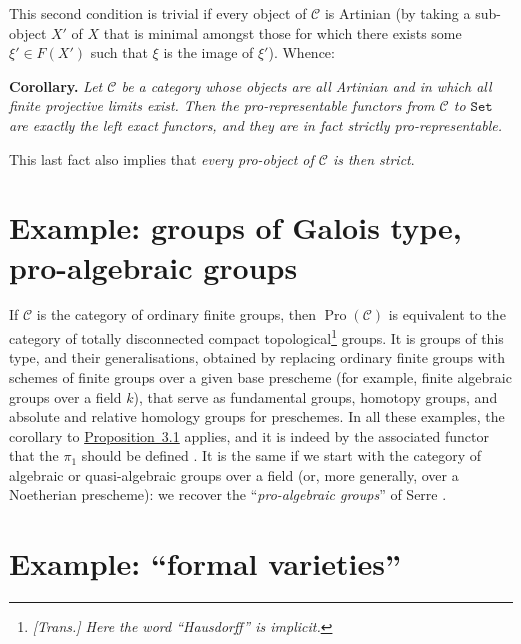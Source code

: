 \documentclass{article}
\newenvironment{itenv}[1]
  {\phantomsection\par\medskip\noindent\textbf{#1.}\itshape}
  {\par\medskip}
\renewcommand{\cal}[1]{{\mathcal{#1}}}
\newcommand{\Set}{\mathtt{Set}}
\DeclareMathOperator{\Pro}{Pro}
\begin{document}
This second condition is trivial if every object of $\cal{C}$ is Artinian (by taking a sub-object $X'$ of $X$ that is minimal amongst those for which there exists some $\xi'\in F(X')$ such that $\xi$ is the image of $\xi'$).
Whence:

\begin{itenv}{Corollary}
  Let $\cal{C}$ be a category whose objects are all Artinian and in which all finite projective limits exist.
  Then the pro-representable functors from $\cal{C}$ to $\Set$ are exactly the left exact functors, and they are in fact strictly pro-representable.
\end{itenv}

This last fact also implies that \emph{every pro-object of $\cal{C}$ is then strict}.


\section{Example: groups of Galois type, pro-algebraic groups}
\label{A.4}

If $\cal{C}$ is the category of ordinary finite groups, then $\Pro(\cal{C})$ is equivalent to the category of totally disconnected compact topological\footnote{\emph{[Trans.] Here the word ``Hausdorff'' is implicit.}} groups.
It is groups of this type, and their generalisations, obtained by replacing ordinary finite groups with schemes of finite groups over a given base prescheme (for example, finite algebraic groups over a field $k$), that serve as fundamental groups, homotopy groups, and absolute and relative homology groups for preschemes.
In all these examples, the corollary to \hyperref[A.3-proposition1]{Proposition~3.1} applies, and it is indeed by the associated functor that the $\pi_1$ should be defined \cite{2}.
It is the same if we start with the category of algebraic or quasi-algebraic groups over a field (or, more generally, over a Noetherian prescheme): we recover the ``\emph{pro-algebraic groups}'' of Serre \cite{4}.


\section{Example: ``formal varieties''}
\label{A.5}
\end{document}
